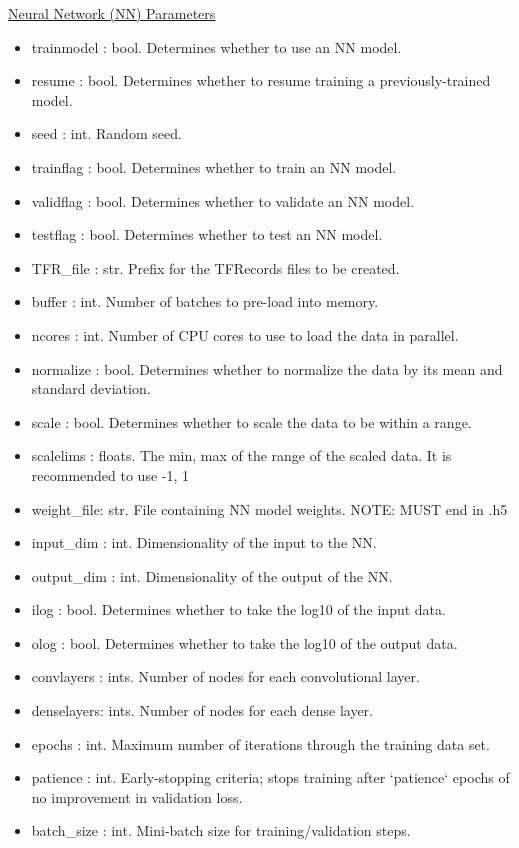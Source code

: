 \documentclass[letterpaper, 12pt]{article}
\begin{document}
\noindent \underline{Neural Network (NN) Parameters}
\begin{itemize}
\item trainmodel : bool. Determines whether to use an NN model.
\item resume     : bool. Determines whether to resume training a previously-trained 
                   model.
\item seed       : int.  Random seed.
\item trainflag  : bool. Determines whether to train    an NN model.
\item validflag  : bool. Determines whether to validate an NN model.
\item testflag   : bool. Determines whether to test     an NN model.

\item TFR\_file   : str.  Prefix for the TFRecords files to be created.
\item buffer     : int.  Number of batches to pre-load into memory.
\item ncores     : int.  Number of CPU cores to use to load the data in parallel.

\item normalize  : bool. Determines whether to normalize the data by its mean and 
                   standard deviation.
\item scale      : bool. Determines whether to scale the data to be within a range.
\item scalelims  : floats. The min, max of the range of the scaled data.
                     It is recommended to use -1, 1

\item weight\_file: str.  File containing NN model weights.
                   NOTE: MUST end in .h5
\item input\_dim  : int.  Dimensionality of the input  to the NN.
\item output\_dim : int.  Dimensionality of the output of the NN.
\item ilog       : bool. Determines whether to take the log10 of the input  data.
\item olog       : bool. Determines whether to take the log10 of the output data.

\item convlayers : ints. Number of nodes for each convolutional layer.
\item denselayers: ints. Number of nodes for each dense         layer.
\item epochs     : int.  Maximum number of iterations through the training data set.
\item patience   : int.  Early-stopping criteria; stops training after `patience` 
                   epochs of no improvement in validation loss.
\item batch\_size : int.  Mini-batch size for training/validation steps.


\end{itemize}
\end{document}
